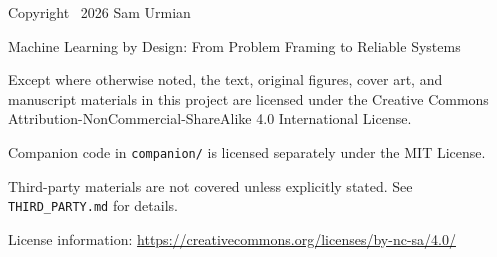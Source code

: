 {\thispagestyle{empty}
\null\vfill

\noindent Copyright \textcopyright\ 2026 Sam Urmian

\medskip
\noindent Machine Learning by Design: From Problem Framing to Reliable Systems

\medskip
\noindent Except where otherwise noted, the text, original figures, cover art,
and manuscript materials in this project are licensed under the Creative
Commons Attribution-NonCommercial-ShareAlike 4.0 International License.

\medskip
\noindent Companion code in \texttt{companion/} is licensed separately under
the MIT License.

\medskip
\noindent Third-party materials are not covered unless explicitly stated. See
\texttt{THIRD\_PARTY.md} for details.

\medskip
\noindent License information:
\url{https://creativecommons.org/licenses/by-nc-sa/4.0/}

\vfill
\clearpage
}
